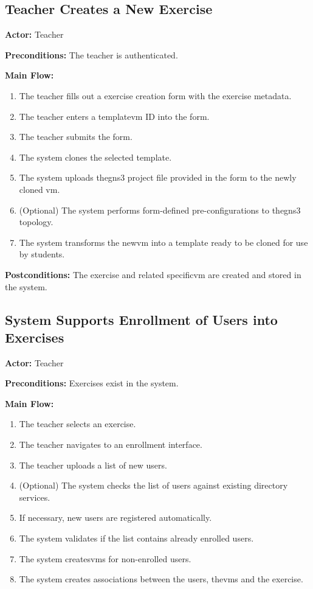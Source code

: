     \subsection{Teacher Creates a New Exercise}
        \textbf{Actor:} Teacher

        \textbf{Preconditions:} The teacher is authenticated.

        \textbf{Main Flow:}
        \begin{enumerate}
            \item The teacher fills out a exercise creation form with the exercise metadata.
            \item The teacher enters a template\ac{vm} ID into the form.
            \item The teacher submits the form.
            \item The system clones the selected template.
            \item The system uploads the\ac{gns3} project file provided in the form to the newly cloned \ac{vm}.
            \item (Optional) The system performs form-defined pre-configurations to the\ac{gns3} topology.
            \item The system transforms the new\ac{vm} into a template ready to be cloned for use by students.
        \end{enumerate}

        \textbf{Postconditions:} The exercise and related specific\ac{vm} are created and stored in the system.

    \subsection{System Supports Enrollment of Users into Exercises}
        \textbf{Actor:} Teacher

        \textbf{Preconditions:} Exercises exist in the system.

        \textbf{Main Flow:}
        \begin{enumerate}
            \item The teacher selects an exercise.
            \item The teacher navigates to an enrollment interface.
            \item The teacher uploads a list of new users.
            \item (Optional) The system checks the list of users against existing directory services.
            \item If necessary, new users are registered automatically.
            \item The system validates if the list contains already enrolled users.
            \item The system creates\ac{vm}s for non-enrolled users.
            \item The system creates associations between the users, the\ac{vm}s and the exercise.
        \end{enumerate}

